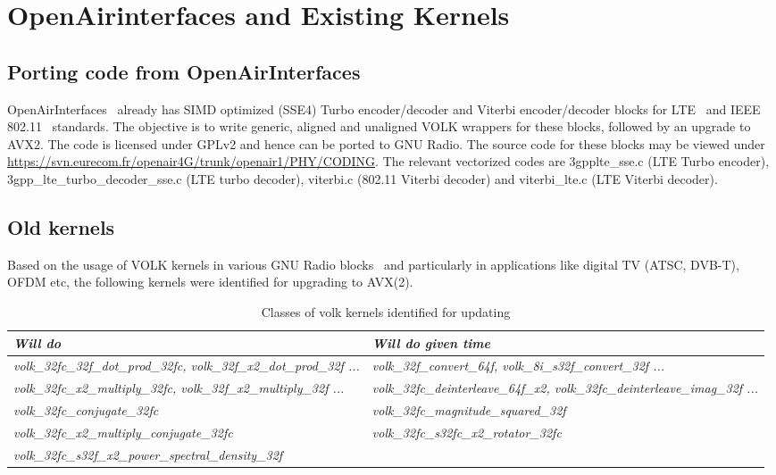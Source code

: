 \documentclass[a4paper,12pt,oneside]{article}
\begin{document}
\section{OpenAirinterfaces and Existing Kernels}

\subsection{Porting code from OpenAirInterfaces}
\label{sec:openair}
OpenAirInterfaces~\cite{openair} already has SIMD optimized (SSE4) Turbo encoder/decoder and Viterbi encoder/decoder blocks for LTE~\cite{lte} and IEEE 802.11~\cite{802.11} standards. The objective is to write generic, aligned and unaligned VOLK wrappers for these blocks, followed by an upgrade to AVX2. The code is licensed under GPLv2 and hence can be ported to GNU Radio. The source code for these blocks may be viewed under \url{https://svn.eurecom.fr/openair4G/trunk/openair1/PHY/CODING}. The relevant vectorized codes are 3gpplte\_sse.c (LTE Turbo encoder), 3gpp\_lte\_turbo\_decoder\_sse.c (LTE turbo decoder), viterbi.c (802.11 Viterbi decoder) and viterbi\_lte.c (LTE Viterbi decoder).

\subsection{Old kernels}
\label{sec:old-kernels}
Based on the usage of VOLK kernels in various GNU Radio blocks~\cite{volk-stats} and particularly in applications like digital TV (ATSC, DVB-T), OFDM etc, the following kernels were identified for upgrading to AVX(2).

\begin{table}[h]
\centering
\begin{tabular}{ >{\itshape}p{7.7cm} | >{\itshape}p{6.3cm} }
\hline 
\textnormal{\bfseries Will do} & \textnormal{\bfseries Will do given time} \\ \hline \hline
volk\_32fc\_32f\_dot\_prod\_32fc, volk\_32f\_x2\_dot\_prod\_32f ... & volk\_32f\_convert\_64f, volk\_8i\_s32f\_convert\_32f ... \\ \hline 
volk\_32fc\_x2\_multiply\_32fc, volk\_32f\_x2\_multiply\_32f ... & volk\_32fc\_deinterleave\_64f\_x2, volk\_32fc\_deinterleave\_imag\_32f ... \\ \hline
volk\_32fc\_conjugate\_32fc & volk\_32fc\_magnitude\_squared\_32f \\ \hline
volk\_32fc\_x2\_multiply\_conjugate\_32fc & volk\_32fc\_s32fc\_x2\_rotator\_32fc \\ \hline
volk\_32fc\_s32f\_x2\_power\_spectral\_density\_32f \\ \hline
\end{tabular}
\caption{Classes of volk kernels identified for updating}
\label{tab:table1}
\end{table}
\end{document}
